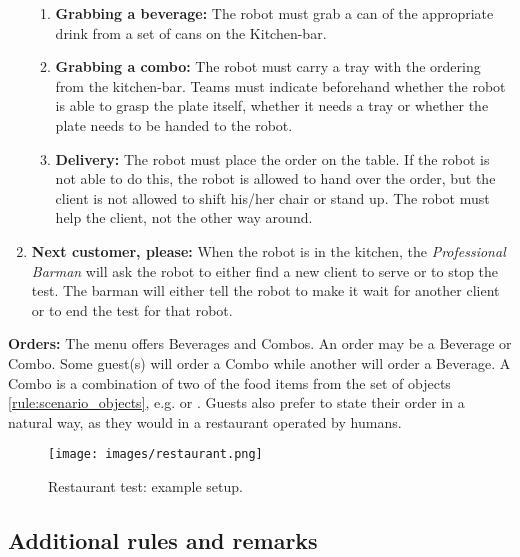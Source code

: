 \begin{enumerate}
\begin{enumerate}
		\item \textbf{Grabbing a beverage:} The robot must grab a can of the appropriate drink from a set of cans on the Kitchen-bar.

		\item \textbf{Grabbing a combo:}  The robot must carry a tray with the ordering from the kitchen-bar.
		Teams must indicate beforehand whether the robot is able to grasp the plate itself, whether it needs a tray or whether the plate needs to be handed to the robot.

		\item \textbf{Delivery:} The robot must place the order on the table.
		If the robot is not able to do this, the robot is allowed to hand over the order, but the client is not allowed to shift his/her chair or stand up.
		The robot must help the client, not the other way around.
	\end{enumerate}

	\item \textbf{Next customer, please:} When the robot is in the kitchen, the \textit{Professional Barman} will ask the robot to either find a new client to serve or to stop the test.
	The barman will either tell the robot  to make it wait for another client or  to end the test for that robot.
\end{enumerate}

\textbf{Orders:} The menu offers Beverages and Combos. An order may be a Beverage or Combo. Some guest(s) will order a Combo while another will order a Beverage.
  A Combo is a combination of two of the food items from the set of objects \ref{rule:scenario_objects}, e.g.  or .
  Guests also prefer to state their order in a natural way, as they would in a restaurant operated by humans.

\begin{figure}[tbp]
	\centering
	\texttt{[image: images/restaurant.png]}
	\caption{Restaurant test: example setup.}
	\label{fig:restaurant}
\end{figure}

\subsection{Additional rules and remarks}

